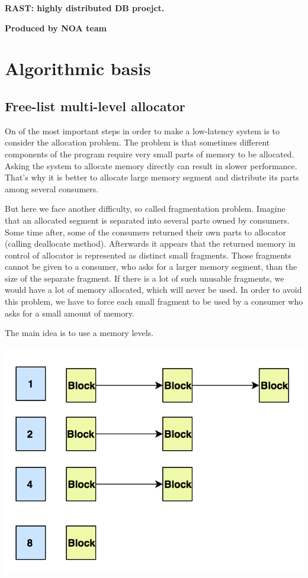 \documentclass{article}
\begin{document}
\begin{center}
 \Large{\bf RAST: highly distributed DB proejct.}

{\large {\bf Produced by NOA team}}
\end{center}

\tableofcontents

\newpage
\section{Algorithmic basis}

\subsection{Free-list multi-level allocator}

On of the most important steps in order to make a low-latency system is to consider the allocation problem. The problem is that sometimes different components of the program require very small parts of memory to be allocated. Asking the system to allocate memory directly can result in slower performance. That's why it is better to allocate large memory segment and distribute its parts among several consumers.

But here we face another difficulty, so called fragmentation problem. Imagine that an allocated segment is separated into several parts owned by consumers. Some time after, some of the consumers returned their own parts to allocator (calling deallocate method). Afterwards it appears that the returned memory in control of allocator is represented as distinct small fragments. Those fragments cannot be given to a consumer, who asks for a larger memory segment, than the size of the separate fragment. If there is a lot of such unusable fragments, we would have a lot of memory allocated, which will never be used. In order to avoid this problem, we have to force each small fragment to be used by a consumer who asks for a small amount of memory.

The main idea is to use a memory levels.

\begin{center}\includegraphics[width=0.5 \textwidth]{image1.png}\end{center}
\end{document}
